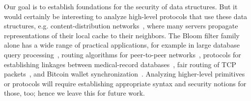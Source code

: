 %

Our goal is to establish foundations for the security of  data
structures. But it would certainly be interesting to analyze high-level
protocols that use these data structures, e.g.
content-distribution networks~\cite{byers2002informed}, where many servers
propagate representations of their local cache to their neighbors. The Bloom
filter family alone has a wide range of practical applications, for example in
large database query processing~\cite{broder2004network}, routing algorithms for
peer-to-peer networks~\cite{reynolds2003efficient}, protocols for establishing
linkages between medical-record databases~\cite{schnell2011novel}, fair routing
of TCP packets~\cite{feng2001stochastic}, and Bitcoin wallet
synchronization~\cite{gervais2014privacy}.
%
Analyzing higher-level primitives or protocols will require establishing
appropriate syntax and security notions for those, too; hence we leave this for
future work.

